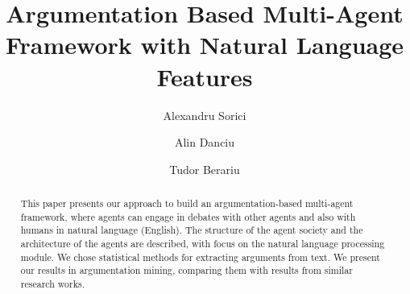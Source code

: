 \documentclass[lnbip]{svmultln}
\begin{document}
%
\mainmatter              %
%
\title{Argumentation Based Multi-Agent Framework with Natural Language Features}
%
%
\author{Alexandru Sorici \and Alin Danciu \and
Tudor Berariu}
%
%
%

\maketitle              %


\begin{abstract}        %
This paper presents our approach to build an argumentation-based multi-agent framework, where agents can engage in debates with other agents and also with humans in natural language (English). The structure of the agent society and the architecture of the agents are described, with focus on the natural language processing module. We chose statistical methods for extracting arguments from text. We present our results in argumentation mining, comparing them with results from similar research works.

\end{abstract}






{\small}
\end{document}
